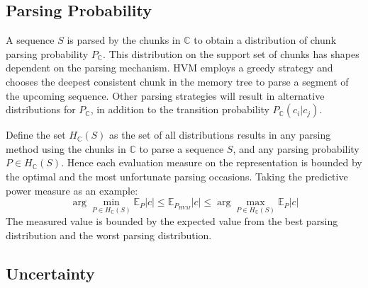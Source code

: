 \documentclass{article} %
\theoremstyle{remark}
\begin{document}
\subsection{Parsing Probability}
A sequence $S$ is parsed by the chunks in $\mathbb{C}$ to obtain a distribution of chunk parsing probability $P_{\mathbb{C}}$. This distribution on the support set of chunks has shapes dependent on the parsing mechanism. HVM employs a greedy strategy and chooses the deepest consistent chunk in the memory tree to parse a segment of the upcoming sequence. Other parsing strategies will result in alternative distributions for $P_{\mathbb{C}}$, in addition to the transition probability $P_{\mathbb{C}}(c_i|c_j)$. 

Define the set $\mathit{H}_{\mathbb{C}}(S)$ as the set of all distributions results in any parsing method using the chunks in $\mathbb{C}$ to parse a sequence $S$, and any parsing probability $P \in \mathit{H}_{\mathbb{C}}(S)$. Hence each evaluation measure on the representation is bounded by the optimal and the most unfortunate parsing occasions. 
Taking the predictive power measure as an example: 
\begin{equation}
    \arg\min_{P \in \mathit{H}_{\mathbb{C}}(S)}\mathbb{E}_{P}|c|\leq \mathbb{E}_{P_{HVM}}|c| \leq  \arg\max_{P \in \mathit{H}_{\mathbb{C}}(S)}\mathbb{E}_{P}|c|
\end{equation}
The measured value is bounded by the expected value from the best parsing distribution and the worst parsing distribution.

\subsection{Uncertainty}
\end{document}
